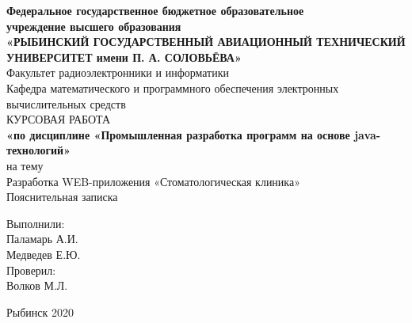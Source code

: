 \documentclass[a4paper]{article}
\begin{document}
\begin{center}
\hfill \break
\normalsize{\textbf{Федеральное государственное бюджетное образовательное}}\\ 
\normalsize{\textbf{учреждение высшего образования}}\\
\small{\textbf{«РЫБИНСКИЙ ГОСУДАРСТВЕННЫЙ АВИАЦИОННЫЙ ТЕХНИЧЕСКИЙ}}\\
\small{\textbf{УНИВЕРСИТЕТ имени П. А. СОЛОВЬЁВА»}}\\
\hfill \break
\normalsize{Факультет радиоэлектронники и информатики}\\
 \hfill \break
\normalsize{Кафедра математического и программного обеспечения электронных вычислительных средств}\\
\hfill\break
\hfill \break
\hfill \break
\hfill \break
\large{КУРСОВАЯ РАБОТА}\\
\normalsize{\textbf{«по дисциплине «Промышленная разработка программ на основе java-технологий»}}\\
\hfill \break
\normalsize{{на тему}}\\


\normalsize{Разработка WEB-приложения «Стоматологическая клиника»
}\\
\normalsize{Пояснительная записка
}\\
\hfill \break
\hfill \break
\end{center}
\hfill \break
\begin{flushright}
{Выполнили:} \\
{Паламарь А.И.} \\
{Медведев Е.Ю.} \\
{Проверил:} \\
{Волков М.Л.} \\
\end{flushright}
\hfill \break
\hfill \break
\hfill \break
\hfill \break
\hfill \break
\hfill \break
\begin{center} Рыбинск 2020 \end{center}
\thispagestyle{empty} %

\newpage
\end{document}
